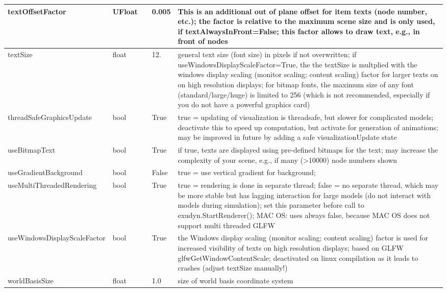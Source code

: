 \begin{center}
\begin{longtable}{| p{4.2cm} | p{2.5cm} | p{0.3cm} | p{3.0cm} | p{6cm} |}
    textOffsetFactor &     UFloat &      &     0.005 &     This is an additional out of plane offset for item texts (node number, etc.); the factor is relative to the maximum scene size and is only used, if textAlwaysInFront=False; this factor allows to draw text, e.g., in front of nodes\\ \hline
    textSize &     float &      &     12. &     general text size (font size) in pixels if not overwritten; if useWindowsDisplayScaleFactor=True, the the textSize is multplied with the windows display scaling (monitor scaling; content scaling) factor for larger texts on on high resolution displays; for bitmap fonts, the maximum size of any font (standard/large/huge) is limited to 256 (which is not recommended, especially if you do not have a powerful graphics card)\\ \hline
    threadSafeGraphicsUpdate &     bool &      &     True &     true = updating of visualization is threadsafe, but slower for complicated models; deactivate this to speed up computation, but activate for generation of animations; may be improved in future by adding a safe visualizationUpdate state\\ \hline
    useBitmapText &     bool &      &     True &     if true, texts are displayed using pre-defined bitmaps for the text; may increase the complexity of your scene, e.g., if many (>10000) node numbers shown\\ \hline
    useGradientBackground &     bool &      &     False &     true = use vertical gradient for background; \\ \hline
    useMultiThreadedRendering &     bool &      &     True &     true = rendering is done in separate thread; false = no separate thread, which may be more stable but has lagging interaction for large models (do not interact with models during simulation); set this parameter before call to exudyn.StartRenderer(); MAC OS: uses always false, because MAC OS does not support multi threaded GLFW\\ \hline
    useWindowsDisplayScaleFactor &     bool &      &     True &     the Windows display scaling (monitor scaling; content scaling) factor is used for increased visibility of texts on high resolution displays; based on GLFW glfwGetWindowContentScale; deactivated on linux compilation as it leads to crashes (adjust textSize manually!)\\ \hline
    worldBasisSize &     float &      &     1.0 &     size of world basis coordinate system\\ \hline
	  \end{longtable}
	\end{center}


